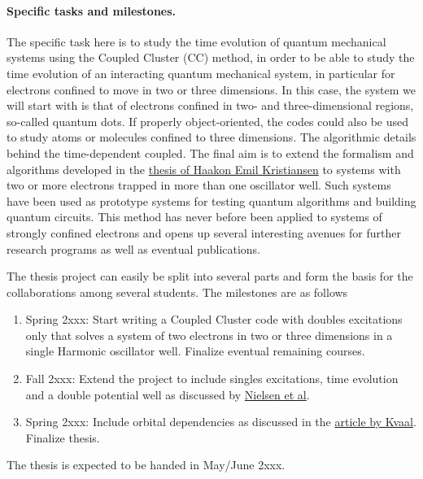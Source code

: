 \documentclass[%
oneside,                 %
final,                   %
10pt]{article}
\begin{document}
\paragraph{Specific tasks and milestones.}
The specific task here is to study the time evolution of quantum mechanical systems using the Coupled Cluster (CC) method, in order to be able to study
the time evolution of an interacting quantum mechanical system, in
particular for electrons confined to move in two or three
dimensions. In this case, the system we will start with is that of
electrons confined in two- and three-dimensional regions, so-called quantum dots.
If properly object-oriented, the codes could also be used to study
atoms or molecules confined to three dimensions. The algorithmic
details behind the time-dependent coupled.  The final aim is to extend the
formalism and algorithms developed in the \href{{https://github.com/haakoek/PythonVersionMaster/tree/master/Thesis/Chapters}}{thesis of Haakon Emil Kristiansen}  to systems
with two or more electrons trapped in more than one oscillator
well. Such systems have been used as prototype systems for testing
quantum algorithms and building quantum circuits.  This method has
never before been applied to systems of strongly confined electrons
and opens up several interesting avenues for further research programs
as well as eventual publications.

The thesis project can easily be split into several parts and form the basis for the collaborations among several students. The milestones are as follows
\begin{enumerate}
\item Spring 2xxx: Start writing a Coupled Cluster code with doubles excitations only that solves a system of two electrons in two or three dimensions in a single Harmonic oscillator well. Finalize eventual remaining courses.

\item Fall 2xxx: Extend the project to include singles excitations, time evolution and a double potential well as discussed by \href{{https://journals.aps.org/prb/abstract/10.1103/PhysRevB.85.035319}}{Nielsen et al}.

\item Spring 2xxx: Include orbital dependencies as discussed in the \href{{http://aip.scitation.org/doi/abs/10.1063/1.4718427}}{article by Kvaal}. Finalize thesis. 
\end{enumerate}

\noindent
The thesis is expected to be handed in May/June  2xxx.
\end{document}
